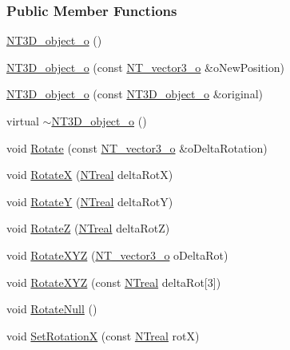 \subsubsection*{Public Member Functions}
\begin{DoxyCompactItemize}
\item 
\hyperlink{class_n_t3_d__object__o_a9a5d1d4aca3fb1f0e5ffc62c19d0dbca}{NT3D\_\-object\_\-o} ()
\item 
\hyperlink{class_n_t3_d__object__o_ad6af536da1d0aa4bcf2a3f1fefdb5f60}{NT3D\_\-object\_\-o} (const \hyperlink{class_n_t__vector3__o}{NT\_\-vector3\_\-o} \&oNewPosition)
\item 
\hyperlink{class_n_t3_d__object__o_a84a1e9c3dd525914d3a6b057ea98fe44}{NT3D\_\-object\_\-o} (const \hyperlink{class_n_t3_d__object__o}{NT3D\_\-object\_\-o} \&original)
\item 
virtual \hyperlink{class_n_t3_d__object__o_aaadf05dda8277c354b497d140ec4352a}{$\sim$NT3D\_\-object\_\-o} ()
\item 
void \hyperlink{class_n_t3_d__object__o_a770f9fc8b5c9d3aafc40a63808b25159}{Rotate} (const \hyperlink{class_n_t__vector3__o}{NT\_\-vector3\_\-o} \&oDeltaRotation)
\item 
void \hyperlink{class_n_t3_d__object__o_aa8ea0d489ad56b7d45b71bd4cdfc69fd}{RotateX} (\hyperlink{nt__types_8h_a814a97893e9deb1eedcc7604529ba80d}{NTreal} deltaRotX)
\item 
void \hyperlink{class_n_t3_d__object__o_a70700cc9879cdf770d00d4410f48356c}{RotateY} (\hyperlink{nt__types_8h_a814a97893e9deb1eedcc7604529ba80d}{NTreal} deltaRotY)
\item 
void \hyperlink{class_n_t3_d__object__o_aa149e78cdfae6d20c9734802f5f1ebc3}{RotateZ} (\hyperlink{nt__types_8h_a814a97893e9deb1eedcc7604529ba80d}{NTreal} deltaRotZ)
\item 
void \hyperlink{class_n_t3_d__object__o_a26a78951fed2e80fc3d6c74a5a49b266}{RotateXYZ} (\hyperlink{class_n_t__vector3__o}{NT\_\-vector3\_\-o} oDeltaRot)
\item 
void \hyperlink{class_n_t3_d__object__o_aafc5c3183575ec33e2be8190fab97e89}{RotateXYZ} (const \hyperlink{nt__types_8h_a814a97893e9deb1eedcc7604529ba80d}{NTreal} deltaRot\mbox{[}3\mbox{]})
\item 
void \hyperlink{class_n_t3_d__object__o_acdcee74d761785cb5c3807b034229adf}{RotateNull} ()
\item 
void \hyperlink{class_n_t3_d__object__o_add614e541e1061187ae18c7837bbfaae}{SetRotationX} (const \hyperlink{nt__types_8h_a814a97893e9deb1eedcc7604529ba80d}{NTreal} rotX)

\end{DoxyCompactItemize}
